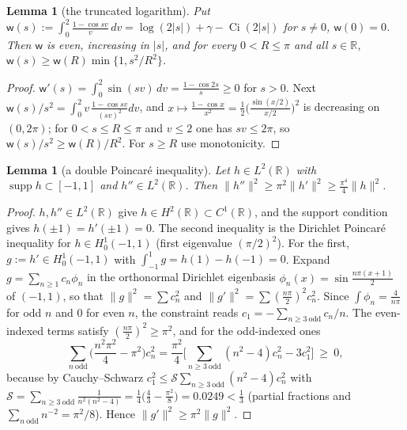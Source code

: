 \documentclass[10pt]{amsart}
\newtheorem{lemma}[theorem]{Lemma}
\theoremstyle{definition}
\theoremstyle{remark}
\newcommand{\R}{\mathbb R}
\newcommand{\supp}{\operatorname{supp}}
\begin{document}
\begin{lemma}[the truncated logarithm]\label{lem:coer-w}
Put $\mathsf w(s):=\int_0^2\frac{1-\cos sv}v\,dv=\log(2|s|)+\gamma-\operatorname{Ci}(2|s|)$ for $s\ne0$, $\mathsf w(0)=0$. Then $\mathsf w$ is
even, increasing in $|s|$, and for every $0<R\le\pi$ and all $s\in\R$, $\mathsf w(s)\ge\mathsf w(R)\min\{1,s^2/R^2\}$.
\end{lemma}
\begin{proof}
$\mathsf w'(s)=\int_0^2\sin(sv)\,dv=\frac{1-\cos2s}s\ge0$ for $s>0$. Next $\mathsf w(s)/s^2=\int_0^2v\,\frac{1-\cos sv}{(sv)^2}dv$, and
$x\mapsto\frac{1-\cos x}{x^2}=\frac12\big(\frac{\sin(x/2)}{x/2}\big)^2$ is decreasing on $(0,2\pi)$; for $0<s\le R\le\pi$ and $v\le2$
one has $sv\le2\pi$, so $\mathsf w(s)/s^2\ge\mathsf w(R)/R^2$. For $s\ge R$ use monotonicity.
\end{proof}

\begin{lemma}[a double Poincar\'e inequality]\label{lem:coer-poinc}
Let $h\in L^2(\R)$ with $\supp h\subset[-1,1]$ and $h''\in L^2(\R)$. Then $\|h''\|^2\ge\pi^2\|h'\|^2\ge\frac{\pi^4}4\|h\|^2$.
\end{lemma}
\begin{proof}
$h,h''\in L^2(\R)$ give $h\in H^2(\R)\subset C^1(\R)$, and the support condition gives $h(\pm1)=h'(\pm1)=0$. The second
inequality is the Dirichlet Poincar\'e inequality for $h\in H^1_0(-1,1)$ (first eigenvalue $(\pi/2)^2$). For the first,
$g:=h'\in H^1_0(-1,1)$ with $\int_{-1}^1g=h(1)-h(-1)=0$. Expand $g=\sum_{n\ge1}c_n\phi_n$ in the orthonormal Dirichlet
eigenbasis $\phi_n(x)=\sin\frac{n\pi(x+1)}2$ of $(-1,1)$, so that $\|g\|^2=\sum c_n^2$ and $\|g'\|^2=\sum(\frac{n\pi}2)^2c_n^2$. Since
$\int\phi_n=\frac4{n\pi}$ for odd $n$ and $0$ for even $n$, the constraint reads $c_1=-\sum_{n\ge3\ \mathrm{odd}}c_n/n$. The
even-indexed terms satisfy $(\frac{n\pi}2)^2\ge\pi^2$, and for the odd-indexed ones
\[
\sum_{n\ \mathrm{odd}}\Big(\frac{n^2\pi^2}4-\pi^2\Big)c_n^2=\frac{\pi^2}4\Big[\sum_{n\ge3\ \mathrm{odd}}(n^2-4)c_n^2-3c_1^2\Big]\ \ge\ 0,
\]
because by Cauchy--Schwarz $c_1^2\le\mathcal S\sum_{n\ge3\ \mathrm{odd}}(n^2-4)c_n^2$ with
$\mathcal S=\sum_{n\ge3\ \mathrm{odd}}\frac1{n^2(n^2-4)}=\frac14\big(\frac43-\frac{\pi^2}8\big)=0.0249<\frac13$ (partial fractions and
$\sum_{n\ \mathrm{odd}}n^{-2}=\pi^2/8$). Hence $\|g'\|^2\ge\pi^2\|g\|^2$.
\end{proof}
\end{document}
